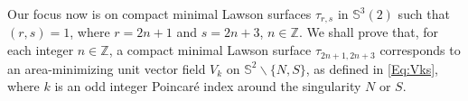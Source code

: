 \documentclass[reqno,11pt]{amsart}
\newtheorem{lemma}[theorem]{Lemma}
\newtheorem{corollary}[theorem]{Corollary}
\begin{document}
{%



Our focus now is on compact minimal Lawson surfaces $\tau_{r,s}$ in $\mathbb{S}^3(2)$ such that $(r,s) = 1$, where $r=2n+1$ and $s=2n+3$, $n \in \mathbb{Z}$. We shall prove that, for each integer $n \in \mathbb{Z}$, a compact minimal Lawson surface $\tau_{2n+1,2n+3}$ corresponds to an area-minimizing unit vector field $V_k$ on $\mathbb{S}^2\backslash\{N,S\}$, as defined in \eqref{Eq:Vks}, where $k$ is an odd integer Poincaré index around the singularity $N$ or $S$.










}
\end{document}
